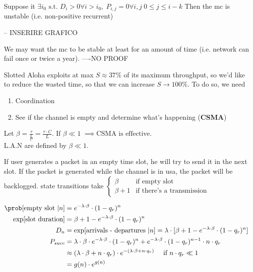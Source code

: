 \begin{lemma}
Suppose it $\exists i_0 \text{ s.t. } D_{i}>0 \forall i > i_0 , \; P_{i,j} = 0 \forall i,j \; 0 \le j \le i-k$
Then the \gls{mc} is unstable (i.e. non-positive recurrent)

-- INSERIRE GRAFICO

We may want the \gls{mc} to be stable at least for an amount of time (i.e. network can fail once or twice a year).
----NO PROOF
\end{lemma}

Slotted Aloha exploits at max $S \approx 37 \%$ of its maximum throughput, so we'd like to reduce the wasted time,
so that we can increase $S \to 100\%$. To do so, we need
\begin{enumerate}
  \item Coordination
  \item See if the channel is empty and determine what's happening (\textbf{CSMA})
\end{enumerate}

Let $\beta = \frac{\tau}{\frac{L}{C}} = \frac{\tau \cdot C}{L}$. If $\beta \ll 1 \; \implies \text{CSMA is effective}$. \\
L.A.N are defined by $\beta \ll 1$.

If user generates a packet in an empty time slot, he will try to send it in the next slot. If the packet is generated while the channel is in usa, the packet will be backlogged.
state transitions take $\begin{cases}
  \beta & \text{if empty slot} \\
  \beta + 1 & \text{if there's a transmission}
\end{cases}$

\begin{equation}\begin{split}
  \prob[\text{empty slot }|n] &= e^{-\lambda \cdot \beta} \cdot (1-q_r)^n \\
  \exp[\text{slot duration}] &= \beta + 1 - e^{-\lambda \cdot \beta} \cdot (1-q_r)^n \\
  D_n &= \exp[\text{arrivals - departures }|n ]= \lambda \cdot [\beta + 1 - e^{-\lambda \cdot \beta} \cdot (1-q_r)^n ]\\
  P_{succ} &= \lambda \cdot \beta \cdot e^{-\lambda \cdot \beta} \cdot (1-q_r)^n + e^{-\lambda \cdot \beta} \cdot (1-q_r)^{n-1} \cdot n \cdot q_r \\
  &\approx (\lambda \cdot \beta + n \cdot q_r) \cdot e^{-(\lambda \cdot \beta + n \cdot q_r)} \quad \text{ if } n \cdot q_r \ll 1 \\
  &= g(n) \cdot e^{g(n)}
\end{split}\end{equation}

